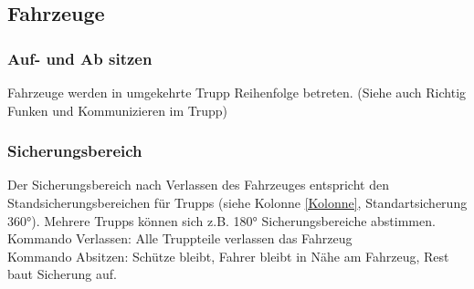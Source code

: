\subsection{Fahrzeuge}
\subsubsection{Auf- und Ab sitzen}
	Fahrzeuge werden in umgekehrte Trupp Reihenfolge betreten. (Siehe auch \glqq Richtig Funken und Kommunizieren im Trupp\grqq)
	
\subsubsection{Sicherungsbereich}
	Der Sicherungsbereich nach Verlassen des Fahrzeuges entspricht den Standsicherungsbereichen für  Trupps (siehe Kolonne \autoref{Kolonne}, Standartsicherung 360°). Mehrere Trupps können sich z.B. 180° Sicherungsbereiche abstimmen. \\
	Kommando Verlassen:  Alle Truppteile verlassen das Fahrzeug \\
	Kommando Absitzen: Schütze bleibt, Fahrer bleibt in Nähe am Fahrzeug, Rest baut Sicherung auf.\\
	
